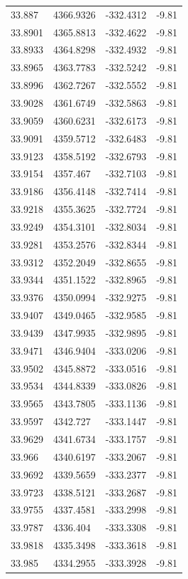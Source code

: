 \begin{table}[H]
\begin{tabular}{llll}
33.887 & 4366.9326 & -332.4312 & -9.81 \\
33.8901 & 4365.8813 & -332.4622 & -9.81 \\
33.8933 & 4364.8298 & -332.4932 & -9.81 \\
33.8965 & 4363.7783 & -332.5242 & -9.81 \\
33.8996 & 4362.7267 & -332.5552 & -9.81 \\
33.9028 & 4361.6749 & -332.5863 & -9.81 \\
33.9059 & 4360.6231 & -332.6173 & -9.81 \\
33.9091 & 4359.5712 & -332.6483 & -9.81 \\
33.9123 & 4358.5192 & -332.6793 & -9.81 \\
33.9154 & 4357.467 & -332.7103 & -9.81 \\
33.9186 & 4356.4148 & -332.7414 & -9.81 \\
33.9218 & 4355.3625 & -332.7724 & -9.81 \\
33.9249 & 4354.3101 & -332.8034 & -9.81 \\
33.9281 & 4353.2576 & -332.8344 & -9.81 \\
33.9312 & 4352.2049 & -332.8655 & -9.81 \\
33.9344 & 4351.1522 & -332.8965 & -9.81 \\
33.9376 & 4350.0994 & -332.9275 & -9.81 \\
33.9407 & 4349.0465 & -332.9585 & -9.81 \\
33.9439 & 4347.9935 & -332.9895 & -9.81 \\
33.9471 & 4346.9404 & -333.0206 & -9.81 \\
33.9502 & 4345.8872 & -333.0516 & -9.81 \\
33.9534 & 4344.8339 & -333.0826 & -9.81 \\
33.9565 & 4343.7805 & -333.1136 & -9.81 \\
33.9597 & 4342.727 & -333.1447 & -9.81 \\
33.9629 & 4341.6734 & -333.1757 & -9.81 \\
33.966 & 4340.6197 & -333.2067 & -9.81 \\
33.9692 & 4339.5659 & -333.2377 & -9.81 \\
33.9723 & 4338.5121 & -333.2687 & -9.81 \\
33.9755 & 4337.4581 & -333.2998 & -9.81 \\
33.9787 & 4336.404 & -333.3308 & -9.81 \\
33.9818 & 4335.3498 & -333.3618 & -9.81 \\
33.985 & 4334.2955 & -333.3928 & -9.81 \\

\end{tabular}
\end{table}
